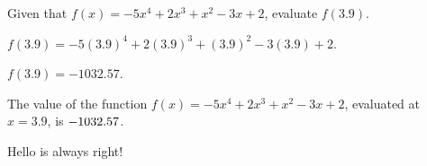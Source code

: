 \documentclass{ximera}
\begin{document}

\begin{exercise}
Given that $f(x)=-5 x^4+2 x^3+x^2-3 x+2$, evaluate $f(3.9)$.
\begin{solution}
\begin{hint}
$f(3.9)=-5 (3.9)^4+2 (3.9)^3+(3.9)^2-3 (3.9)+2$.
\end{hint}
\begin{hint}
$f(3.9)=-1032.57$.
\end{hint}
The value of the function $f(x) = -5 x^4+2 x^3+x^2-3 x+2$, evaluated at $x=3.9$, is ${-1032.57}$.
\end{solution}
\end{exercise}


\begin{question}
\begin{multiple-choice}
\end{multiple-choice}
\begin{solution}
\begin{hint}
Hello is always right!
\end{hint}
\end{solution}
\end{question}
\end{document}
